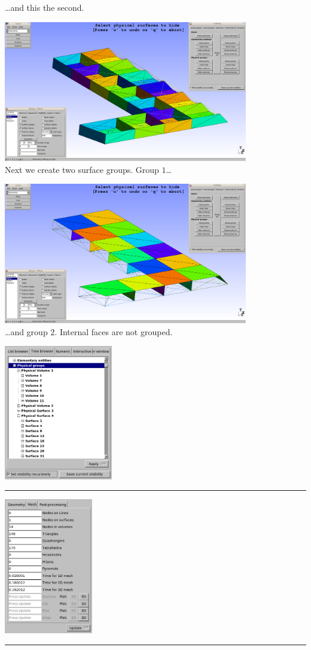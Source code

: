\begin{frame}
\begin{center}
    \ldots and this the second.
  \end{center}
  \begin{center}
    \includegraphics[width=0.8\textwidth]{./EPS/L/L_surfgroup1}\\[0.5em]
    Next we create two surface groups. Group $1$\ldots
  \end{center}
  \begin{center}
    \includegraphics[width=0.8\textwidth]{./EPS/L/L_surfgroup2}\\[0.5em]
    \ldots and group $2$. Internal faces are not grouped.
  \end{center}
  \begin{center}
    \includegraphics[width=0.355\textwidth]{./EPS/L/L_physgroups}\rule{1mm}{0mm}
    \includegraphics[width=0.29\textwidth]{./EPS/L/L_meshstatistics}\rule{1mm}{0mm}

\end{center}
\end{frame}

